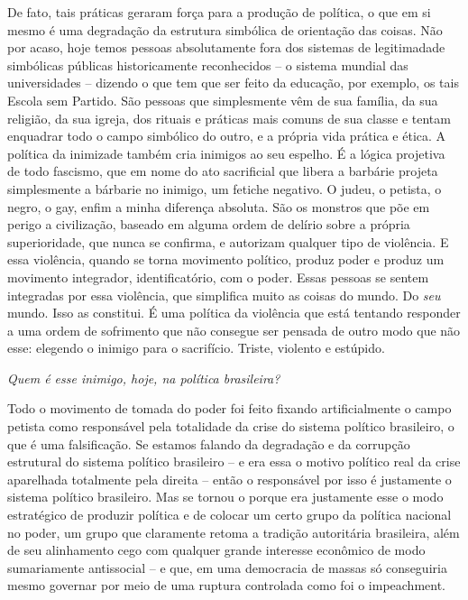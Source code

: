 De fato, tais práticas geraram força para a produção de política, o que
em si mesmo é uma degradação da estrutura simbólica de orientação das
coisas. Não por acaso, hoje temos pessoas absolutamente fora dos
sistemas de legitimadade simbólicas públicas historicamente reconhecidos
-- o sistema mundial das universidades -- dizendo o que tem que ser
feito da educação, por exemplo, os tais Escola sem Partido. São pessoas
que simplesmente vêm de sua família, da sua religião, da sua igreja, dos
rituais e práticas mais comuns de sua classe e tentam enquadrar todo o
campo simbólico do outro, e a própria vida prática e ética. A política
da inimizade também cria inimigos ao seu espelho. É a lógica projetiva
de todo fascismo, que em nome do ato sacrificial que libera a barbárie
projeta simplesmente a bárbarie no inimigo, um fetiche negativo. O
judeu, o petista, o negro, o gay, enfim a minha diferença absoluta. São
os monstros que põe em perigo a civilização, baseado em alguma ordem de
delírio sobre a própria superioridade, que nunca se confirma, e
autorizam qualquer tipo de violência. E essa violência, quando se torna
movimento político, produz poder e produz um movimento integrador,
identificatório, com o poder. Essas pessoas se sentem integradas por
essa violência, que simplifica muito as coisas do mundo. Do \emph{seu}
mundo. Isso as constitui. É uma política da violência que está tentando
responder a uma ordem de sofrimento que não consegue ser pensada de
outro modo que não esse: elegendo o inimigo para o sacrifício. Triste,
violento e estúpido.

\medskip

\noindent\emph{Quem é esse inimigo, hoje, na política brasileira?}

\noindent Todo o movimento de tomada do poder foi feito fixando artificialmente o
campo petista como responsável pela totalidade da crise do sistema
político brasileiro, o que é uma falsificação. Se estamos falando da
degradação e da corrupção estrutural do sistema político brasileiro -- e
era essa o motivo político real da crise aparelhada totalmente pela
direita -- então o responsável por isso é justamente o sistema político
brasileiro. Mas se tornou o  porque era justamente esse o modo
estratégico de produzir política e de colocar um certo grupo da política
nacional no poder, um grupo que claramente retoma a tradição autoritária
brasileira, além de seu alinhamento cego com qualquer grande interesse
econômico de modo sumariamente antissocial -- e que, em uma democracia
de massas só conseguiria mesmo governar por meio de uma ruptura
controlada como foi o impeachment.

